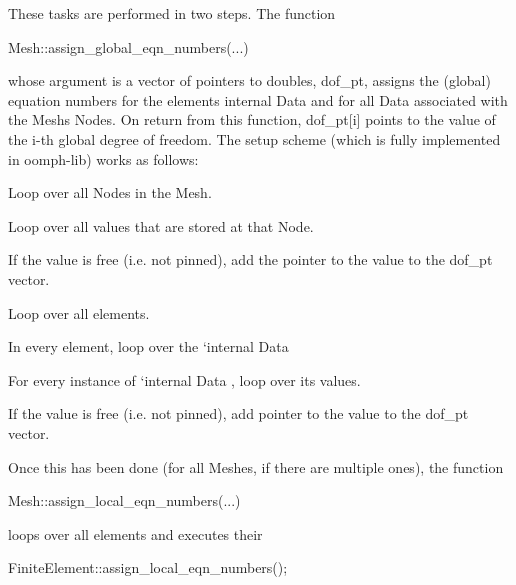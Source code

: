 These tasks are performed in two steps. The function 
\begin{DoxyCode}
Mesh::assign\_global\_eqn\_numbers(...) 
\end{DoxyCode}
 whose argument is a vector of pointers to doubles, {\ttfamily dof\+\_\+pt}, assigns the (global) equation numbers for the element\textquotesingle{}s internal {\ttfamily Data} and for all {\ttfamily Data} associated with the {\ttfamily Mesh\textquotesingle{}s} {\ttfamily Nodes}. On return from this function, {\ttfamily dof\+\_\+pt}\mbox{[}i\mbox{]} points to the value of the i-\/th global degree of freedom. The setup scheme (which is fully implemented in {\ttfamily oomph-\/lib}) works as follows\+:
\begin{DoxyEnumerate}
\item Loop over all {\ttfamily Nodes} in the {\ttfamily Mesh}.
\begin{DoxyItemize}
\item Loop over all values that are stored at that {\ttfamily Node}.
\begin{DoxyItemize}
\item If the value is free (i.\+e. not pinned), add the pointer to the value to the {\ttfamily dof\+\_\+pt} vector.
\end{DoxyItemize}
\end{DoxyItemize}
\item Loop over all elements.
\begin{DoxyItemize}
\item In every element, loop over the `internal {\ttfamily Data} \textquotesingle{}
\begin{DoxyItemize}
\item For every instance of `internal {\ttfamily Data} \textquotesingle{}, loop over its values.
\begin{DoxyItemize}
\item If the value is free (i.\+e. not pinned), add pointer to the value to the {\ttfamily dof\+\_\+pt} vector.
\end{DoxyItemize}
\end{DoxyItemize}
\end{DoxyItemize}
\end{DoxyEnumerate}Once this has been done (for all {\ttfamily Meshes}, if there are multiple ones), the function 
\begin{DoxyCode}
Mesh::assign\_local\_eqn\_numbers(...) 
\end{DoxyCode}
 loops over all elements and executes their 
\begin{DoxyCode}
FiniteElement::assign\_local\_eqn\_numbers(); 
\end{DoxyCode}
